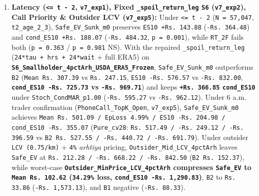 \documentclass[11pt,a4paper]{article}
\begin{document}
\begin{enumerate}
  \item \textbf{Latency (\texttt{<= t - 2}, \texttt{v7\_exp1}), Fixed \texttt{\_spoil\_return\_leg} \texttt{S6} (\texttt{v7\_exp2}), Call Priority \& Outsider LCV (\texttt{v7\_exp5}):} Under \texttt{<= t - 2} (\texttt{N = 57,047}, \texttt{t2\_age\_2\_3}), \texttt{Safe\_EV\_Sunk\_m0} preserves \texttt{ES10 +Rs.\,143.88} (\texttt{-Rs.\,364.48}) and \texttt{cond\_ES10 +Rs.\,188.07} (\texttt{-Rs.\,484.32}, \texttt{p = 0.001}), while \texttt{RT\_2F} fails both (\texttt{p = 0.363} / \texttt{p = 0.981} NS). With the repaired \texttt{\_spoil\_return\_leg} (\texttt{24*tau + hrs + 24*wait} + full ERA5) on \textbf{\texttt{S6\_Smallholder\_4pctArh\_USDA\_ERA5\_Frozen}}, \texttt{Safe\_EV\_Sunk\_m0} outperforms \texttt{B2} (\texttt{Mean Rs.\,307.39} vs \texttt{Rs.\,247.15}, \texttt{ES10 -Rs.\,576.57} vs \texttt{-Rs.\,832.00}, \textbf{\texttt{cond\_ES10 -Rs.\,725.73} vs \texttt{-Rs.\,969.71}}) and keeps \textbf{\texttt{+Rs.\,366.85} \texttt{cond\_ES10}} under \texttt{Stoch\_CondMAR\_p1.00} (\texttt{-Rs.\,595.27} vs \texttt{-Rs.\,962.12}). Under 6 a.m. trader confirmation (\texttt{PhoneCall\_TopK\_Open}, \texttt{v7\_exp5}), \texttt{Safe\_EV\_Sunk\_m0} achieves \texttt{Mean Rs.\,501.09 / EpLoss 4.99\% / ES10 -Rs.\,204.98 / cond\_ES10 -Rs.\,355.07} (\texttt{Pure\_cv28}: \texttt{Rs.\,517.49 / -Rs.\,249.12 / -Rs.\,396.59} vs \texttt{B2 Rs.\,527.55 / -Rs.\,440.72 / -Rs.\,691.79}). Under outsider \texttt{LCV (0.75/km)} + \texttt{4\%} \textit{arhtiya} pricing, \texttt{Outsider\_Mid\_LCV\_4pctArh} leaves \texttt{Safe\_EV} at \texttt{Rs.\,212.28 / -Rs.\,668.22 / -Rs.\,842.50} (\texttt{B2 Rs.\,152.37}), while worst-case \textbf{\texttt{Outsider\_MinPrice\_LCV\_4pctArh} compresses \texttt{Safe\_EV} to \texttt{Mean Rs.\,102.62} (\texttt{34.29\%} loss, \texttt{cond\_ES10 -Rs.\,1,290.83})}, \texttt{B2} to \texttt{Rs.\,33.86} (\texttt{-Rs.\,1,573.13}), and \texttt{B1} negative (\texttt{-Rs.\,88.33}).

\end{enumerate}
\end{document}
